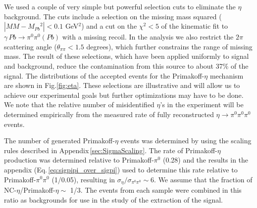 We used a couple of very simple but powerful selection cuts to
eliminate the $\eta$ background. The cuts include a selection on the
missing mass squared ($|MM - M_{Pb}{^2}| < 0.1$ GeV$^2$) and a cut on
the $\chi^2 < 5$ of the kinematic fit to $\gamma\,Pb\rightarrow
\pi^0\pi^0 (Pb)$ with a missing recoil. In the analysis we also
restrict the $2\pi$ scattering angle ($\theta_{\pi\pi} <1.5$ degrees),
which further constrains the range of missing mass. The result of
these selections, which have been applied uniformly to signal and
background, reduce the contamination from this source to about 37\% of
the signal. The distributions of the accepted events for the
Primakoff-$\eta$ mechanism are shown in Fig.\ref{fig:eta}.  These
selections are illustrative and will allow us to achieve our
experimental goals but further optimizations may have to be done. We note that
the relative number of misidentified $\eta$'s in the experiment will
be determined empirically from the measured rate of fully
reconstructed $\eta\rightarrow\pi^0\pi^0\pi^0$ events.

The number of generated Primakoff-$\eta$ events was determined by
using the scaling rules described in
Appendix\,\ref{sec:SigmaScaling}. The rate of Primakoff-$\eta$
production was determined relative to Primakoff-$\pi^0$ (0.28) and the
results in the appendix (Eq.\,\ref{eq:sigpipi_over_sigpi}) used to
determine this rate relative to Primakoff-$\pi^0\pi^0$ (1/0.05),
resulting in $\sigma_\eta/\sigma_{\pi^0\pi^0} \sim 6$. We assume that
the fraction of NC-$\eta$/Primakoff-$\eta \sim$ 1/3. The events from
each sample were combined in this ratio as backgrounds for use in the
study of the extraction of the signal.

